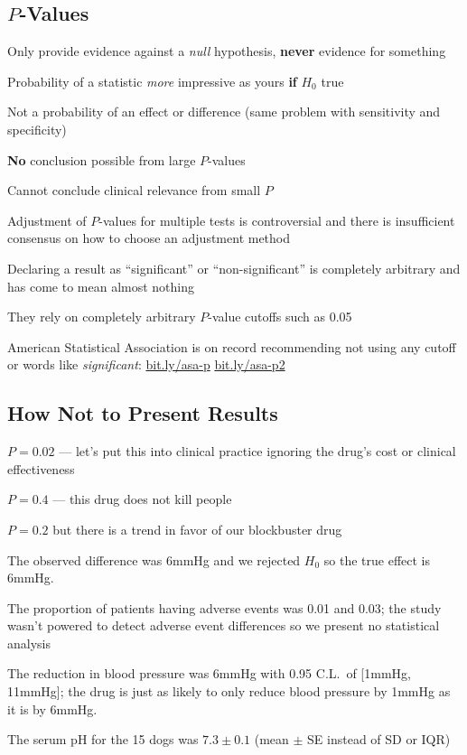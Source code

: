 \subsection{$P$-Values} 
\bi
\item Only provide evidence against a \emph{null} hypothesis,
  \textbf{never} evidence for something
\item Probability of a statistic \emph{more} impressive as yours \textbf{\Large
    if} $H_0$ true
\item Not a probability of an effect or difference (same problem with
  sensitivity and specificity)
\item \textbf{No} conclusion possible from large $P$-values
\item Cannot conclude clinical relevance from small $P$
\item Adjustment of $P$-values for multiple tests is controversial and
  there is insufficient consensus on how to choose an adjustment
  method
\item Declaring a result as ``significant'' or ``non-significant'' is completely arbitrary and has come to mean almost nothing
 \bi
  \item They rely on completely arbitrary $P$-value cutoffs such as 0.05
  \item American Statistical Association is on record recommending not using any cutoff or words like \emph{significant}: \href{https://amstat.tandfonline.com/doi/full/10.1080/00031305.2016.1154108}{bit.ly/asa-p} \href{https://www.tandfonline.com/doi/full/10.1080/00031305.2019.1583913}{bit.ly/asa-p2}
  \ei
\ei

\subsection{How Not to Present Results} 
\bi
\item $P=0.02$ --- let's put this into clinical practice ignoring the
  drug's cost or clinical effectiveness
\item $P=0.4$ --- this drug does not kill people
\item $P=0.2$ but there is a trend in favor of our blockbuster drug
\item The observed difference was 6mmHg and we rejected $H_0$ so the
  true effect is 6mmHg.
\item The proportion of patients having adverse events was 0.01 and
  0.03; the study wasn't powered to detect adverse event differences
  so we present no statistical analysis
\item The reduction in blood pressure was 6mmHg with 0.95 C.L.\ of
  [1mmHg, 11mmHg]; the drug is just as likely to only reduce blood
  pressure by 1mmHg as it is by 6mmHg.
\item The serum pH for the 15 dogs was $7.3 \pm 0.1$ (mean $\pm$ SE instead of SD or IQR)
\ei

